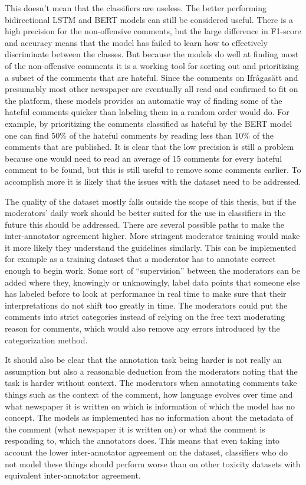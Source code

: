 \documentclass[nofilelist]{cslthse-msc}
\begin{document}
This doesn't mean that the classifiers are useless. The better performing bidirectional LSTM and BERT models can still be considered useful. There is a high precision for the non-offensive comments, but the large difference in F1-score and accuracy means that the model has failed to learn how to effectively discriminate between the classes.  But because the models do well at finding most of the non-offensive comments it is a working tool for sorting out and prioritizing a subset of the comments that are hateful. Since the comments on Ifrågasätt and presumably most other newspaper are eventually all read and confirmed to fit on the platform, these models provides an automatic way of finding some of the hateful comments quicker than labeling them in a random order would do. For example, by prioritizing the comments classified as hateful by the BERT model one can find 50\% of the hateful comments by reading less than 10\% of the comments that are published. It is clear that the low precision is still a problem because one would need to read 
 an average of 15 comments for every hateful comment to be found, but this is still useful to remove some comments earlier. To accomplish more it is likely that the issues with the dataset need to be addressed.

The quality of the dataset mostly falls outside the scope of this thesis, but if the moderators' daily work should be better suited for the use in classifiers in the future this should be addressed. There are several possible paths to make the inter-annotator agreement higher. More stringent moderator training would make it more likely they understand the guidelines similarly. This can be implemented for example as a training dataset that a moderator has to annotate correct enough to begin work. Some sort of ``supervision'' between the moderators can be added where they, knowingly or unknowingly, label data points that someone else has labeled before to look at performance in real time to make sure that their interpretations do not shift too greatly in time. The moderators could put the comments into strict categories instead of relying on the free text moderating reason for comments, which would also remove any errors introduced by the categorization method. 

It should also be clear that the annotation task being harder is not really an assumption but also a reasonable deduction from the moderators noting that the task is harder without context. The moderators when annotating comments take things such as the context of the comment, how language evolves over time and what newspaper it is written on which is information of which the model has no concept. The models as implemented has no information about the metadata of the comment (what newspaper it is written on) or what the comment is responding to, which the annotators does. This means that even taking into account the lower inter-annotator agreement on the dataset, classifiers who do not model these things should perform worse than on other toxicity datasets with equivalent inter-annotator agreement. 
\end{document}
